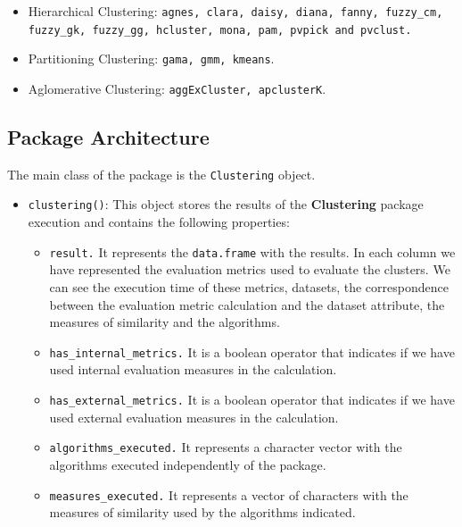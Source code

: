 \documentclass[
]{article}
\providecommand{\tightlist}{%
  \setlength{\itemsep}{0pt}\setlength{\parskip}{0pt}}
\begin{document}
\begin{itemize}
\tightlist
\item
  Hierarchical Clustering:
  \texttt{agnes, clara, daisy, diana, fanny, fuzzy\_cm, fuzzy\_gk, fuzzy\_gg, hcluster, mona, pam, pvpick and pvclust.}
\item
  Partitioning Clustering: \texttt{gama, gmm, kmeans}.
\item
  Aglomerative Clustering: \texttt{aggExCluster, apclusterK}.
\end{itemize}

\hypertarget{package-architecture}{%
\subsection{Package Architecture}\label{package-architecture}}

The main class of the package is the \texttt{Clustering} object.

\begin{itemize}
\tightlist
\item
  \texttt{clustering()}: This object stores the results of the
  \textbf{Clustering} package execution and contains the following
  properties:

  \begin{itemize}
  \tightlist
  \item
    \texttt{result.} It represents the \texttt{data.frame} with the
    results. In each column we have represented the evaluation metrics
    used to evaluate the clusters. We can see the execution time of
    these metrics, datasets, the correspondence between the evaluation
    metric calculation and the dataset attribute, the measures of
    similarity and the algorithms.
  \item
    \texttt{has\_internal\_metrics.} It is a boolean operator that
    indicates if we have used internal evaluation measures in the
    calculation.
  \item
    \texttt{has\_external\_metrics.} It is a boolean operator that
    indicates if we have used external evaluation measures in the
    calculation.
  \item
    \texttt{algorithms\_executed.} It represents a character vector with
    the algorithms executed independently of the package.
  \item
    \texttt{measures\_executed.} It represents a vector of characters
    with the measures of similarity used by the algorithms indicated.
  \end{itemize}
\end{itemize}
\end{document}
